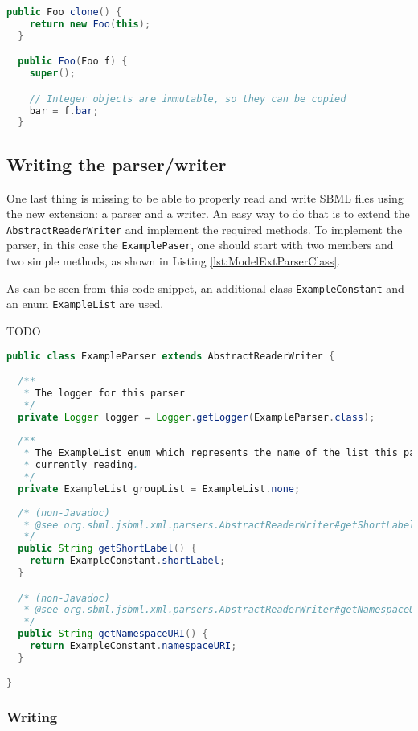 \begin{lstlisting}[language=Java,caption={Example of the \texttt{clone} method for the \texttt{Foo} class},label={lst:ModelExtCloneFoo}]
  public Foo clone() {
    return new Foo(this);
  }

  public Foo(Foo f) {
    super();

    // Integer objects are immutable, so they can be copied
    bar = f.bar;
  }
\end{lstlisting}


\subsection{Writing the parser/writer}

One last thing is missing to be able to properly read and write SBML files using the new extension: a parser and a writer.
An easy way to do that is to extend the \texttt{AbstractReaderWriter} and implement the required methods.
To implement the parser, in this case the \texttt{ExamplePaser}, one should start with two members and two simple methods, as shown in Listing \ref{lst:ModelExtParserClass}.

As can be seen from this code snippet, an additional class \texttt{ExampleConstant} and an enum \texttt{ExampleList} are used.

TODO


\begin{lstlisting}[language=Java,caption={The first part of the parser for the extension},label={lst:ModelExtParserClass}]
public class ExampleParser extends AbstractReaderWriter {

  /**
   * The logger for this parser
   */
  private Logger logger = Logger.getLogger(ExampleParser.class);
  
  /**
   * The ExampleList enum which represents the name of the list this parser is
   * currently reading.
   */
  private ExampleList groupList = ExampleList.none;
  
  /* (non-Javadoc)
   * @see org.sbml.jsbml.xml.parsers.AbstractReaderWriter#getShortLabel()
   */
  public String getShortLabel() {
    return ExampleConstant.shortLabel;
  }

  /* (non-Javadoc)
   * @see org.sbml.jsbml.xml.parsers.AbstractReaderWriter#getNamespaceURI()
   */
  public String getNamespaceURI() {
    return ExampleConstant.namespaceURI;
  }

}
\end{lstlisting}


\subsubsection{Writing}

